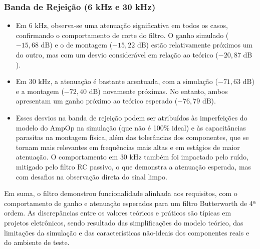 \subsubsection{Banda de Rejeição (6 kHz e 30 kHz)}
\begin{itemize}
    \item Em $6 \text{ kHz}$, observa-se uma atenuação significativa em todos os casos, confirmando o comportamento de corte do filtro. O ganho simulado ($-15,68 \text{ dB}$) e o de montagem ($-15,22 \text{ dB}$) estão relativamente próximos um do outro, mas com um desvio considerável em relação ao teórico ($-20,87 \text{ dB}$).
    \item Em $30 \text{ kHz}$, a atenuação é bastante acentuada, com a simulação ($-71,63 \text{ dB}$) e a montagem ($-72,40 \text{ dB}$) novamente próximas. No entanto, ambos apresentam um ganho próximo ao teórico esperado ($-76,79 \text{ dB}$).
    \item Esses desvios na banda de rejeição podem ser atribuídos às imperfeições do modelo do AmpOp na simulação (que não é 100\% ideal) e às capacitâncias parasitas na montagem física, além das tolerâncias dos componentes, que se tornam mais relevantes em frequências mais altas e em estágios de maior atenuação. O comportamento em $30 \text{ kHz}$ também foi impactado pelo ruído, mitigado pelo filtro RC passivo, o que demonstra a atenuação esperada, mas com desafios na observação direta do sinal limpo.
\end{itemize}

Em suma, o filtro demonstrou funcionalidade alinhada aos requisitos, com o comportamento de ganho e atenuação esperados para um filtro Butterworth de 4ª ordem. As discrepâncias entre os valores teóricos e práticos são típicas em projetos eletrônicos, sendo resultado das simplificações do modelo teórico, das limitações da simulação e das características não-ideais dos componentes reais e do ambiente de teste.